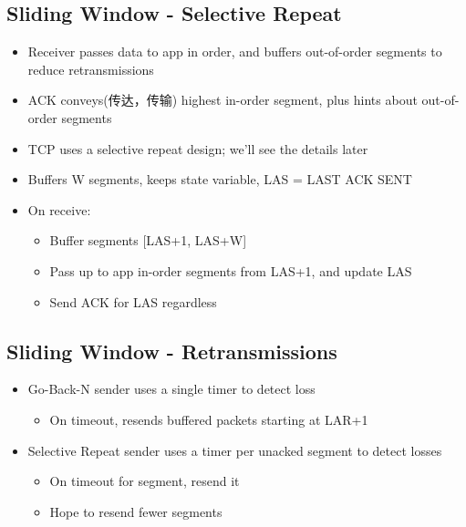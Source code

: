 \documentclass[12pt]{ctexart}   %
\begin{document}
	\subsection{Sliding Window - Selective Repeat}
	\begin{itemize}
		\item Receiver passes data to app in order, and buffers out-of-order segments to reduce retransmissions
		\item ACK conveys(传达，传输) highest in-order segment, plus hints about out-of-order segments
		\item TCP uses a selective repeat design; we'll see the details later
		
		\item Buffers W segments, keeps state variable, LAS = LAST ACK SENT
		\item On receive:
		\begin{itemize}
			\item Buffer segments [LAS+1, LAS+W]
			\item Pass up to app in-order segments from LAS+1, and update LAS
			\item Send ACK for LAS regardless
		\end{itemize}
	\end{itemize}
	
	\subsection{Sliding Window - Retransmissions}
	\begin{itemize}
		\item Go-Back-N sender uses a single timer to detect loss
		\begin{itemize}
			\item On timeout, resends buffered packets starting at LAR+1
		\end{itemize}
		
		\item Selective Repeat sender uses a timer per unacked segment to detect losses
		\begin{itemize}
			\item On timeout for segment, resend it
			\item Hope to resend fewer segments
		\end{itemize}
	\end{itemize}
	
\end{document}
